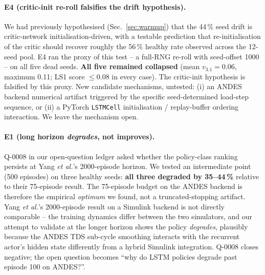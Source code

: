 \documentclass[journal,onecolumn,11pt]{IEEEtran}
\begin{document}
\paragraph{E4 (critic-init re-roll falsifies the drift hypothesis).}
We had previously hypothesised (Sec.~\ref{sec:warmup}) that the
44\,\% seed drift is critic-network initialisation-driven, with a
testable prediction that re-initialisation of the critic should
recover roughly the 56\,\% healthy rate observed across the
12-seed pool. E4 ran the proxy of this test -- a full-RNG re-roll
with seed-offset 1000 -- on all five dead seeds. \textbf{All five
remained collapsed} (mean $v_{3.1} = 0.06$, maximum 0.11; LS1
score $\leq 0.08$ in every case). The critic-init hypothesis is
falsified by this proxy. New candidate mechanisms, untested:
(i) an ANDES backend numerical artifact triggered by the specific
seed-determined load-step sequence, or
(ii) a PyTorch \texttt{LSTMCell} initialisation / replay-buffer
ordering interaction. We leave the mechanism open.

\paragraph{E1 (long horizon \emph{degrades}, not improves).}
Q-0008 in our open-question ledger asked whether the policy-class
ranking persists at Yang \emph{et al.}'s 2000-episode horizon.
We tested an intermediate point (500 episodes) on three healthy
seeds: \textbf{all three degraded by 35--44\,\%} relative to their
75-episode result. The 75-episode budget on the ANDES backend is
therefore the empirical \emph{optimum} we found, not a
truncated-stopping artifact. Yang \emph{et al.}'s 2000-episode
result on a Simulink backend is not directly comparable -- the
training dynamics differ between the two simulators, and our
attempt to validate at the longer horizon shows the policy
\emph{degrades}, plausibly because the ANDES TDS sub-cycle
smoothing interacts with the recurrent actor's hidden state
differently from a hybrid Simulink integration. Q-0008 closes
negative; the open question becomes ``why do LSTM policies
degrade past episode 100 on ANDES?''.
\end{document}

